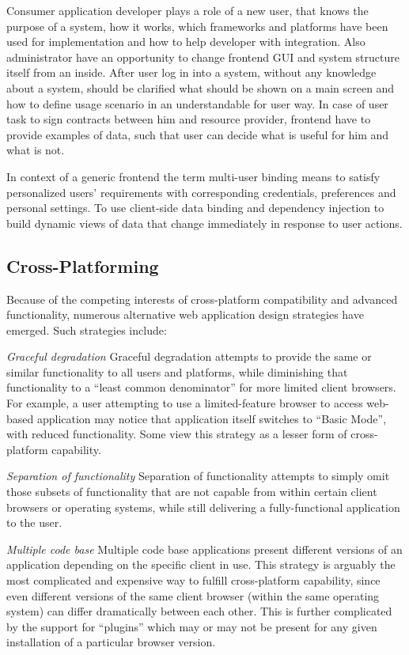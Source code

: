 	Consumer application developer plays a role of a new user, that knows the purpose of a system, how it works, which frameworks and platforms have been used for implementation and how to help developer with integration. Also administrator have an opportunity to change frontend GUI and system structure itself from an inside.
	\newline
	After user log in into a system, without any knowledge about a system, should be clarified what should be shown on a main screen and how to define usage scenario in an understandable for user way. In case of user task to sign contracts between him and resource provider, frontend have to provide examples of data, such that user can decide what is useful for him and what is not.

	In context of a generic frontend the term multi-user binding means to satisfy personalized users' requirements with corresponding credentials, preferences and personal settings. To use client-side data binding and dependency injection to build dynamic views of data that change immediately in response to user actions.

\subsection {Cross-Platforming}
	Because of the competing interests of cross-platform compatibility and advanced functionality, numerous alternative web application design strategies have emerged. Such strategies include:

	\emph{Graceful degradation}
	\newline
	Graceful degradation attempts to provide the same or similar functionality to all users and platforms, while diminishing that functionality to a ``least common denominator'' for more limited client browsers. For example, a user attempting to use a limited-feature browser to access web-based application may notice that application itself switches to ``Basic Mode'', with reduced functionality. Some view this strategy as a lesser form of cross-platform capability.

	\emph{Separation of functionality}
	\newline
	Separation of functionality attempts to simply omit those subsets of functionality that are not capable from within certain client browsers or operating systems, while still delivering a fully-functional application to the user.

	\emph{Multiple code base}
	\newline
	Multiple code base applications present different versions of an application depending on the specific client in use. This strategy is arguably the most complicated and expensive way to fulfill cross-platform capability, since even different versions of the same client browser (within the same operating system) can differ dramatically between each other. This is further complicated by the support for ``plugins'' which may or may not be present for any given installation of a particular browser version.

